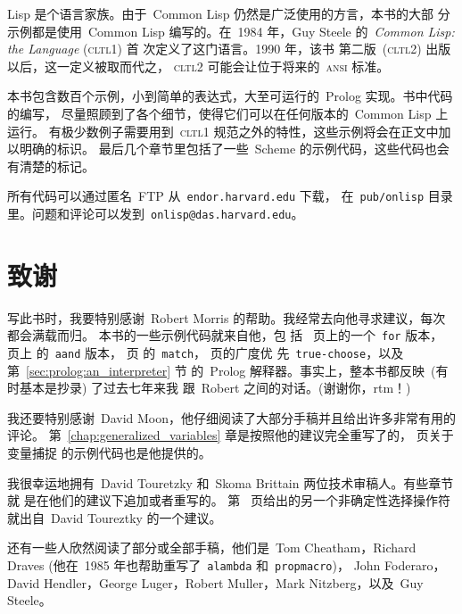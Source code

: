 Lisp 是个语言家族。由于~Common Lisp 仍然是广泛使用的方言，本书的大部
分示例都是使用~Common Lisp 编写的。在~1984 年，Guy Steele 
的~\emph{Common Lisp: the Language}%
(\textsc{cltl}1) 首
次定义了这门语言。1990 年，该书
第二版~(\textsc{cltl}2)  出版以后，这一定义被取而代之，
\textsc{cltl}2 可能会让位于将来的~\textsc{ansi} 标准。

本书包含数百个示例，小到简单的表达式，大至可运行的~Prolog 实现。书中代码的编写，
尽量照顾到了各个细节，使得它们可以在任何版本的~Common Lisp 上运行。
有极少数例子需要用到~\textsc{cltl}1 规范之外的特性，这些示例将会在正文中加以明确的标识。
最后几个章节里包括了一些~Scheme 的示例代码，这些代码也会有清楚的标记。

所有代码可以通过匿名~\textsc{FTP} 从~\texttt{endor.harvard.edu} 下载，
在~\texttt{pub/onlisp} 目录里。问题和评论可以发到~\texttt{onlisp@das.harvard.edu}。

\section*{致谢}
\label{sec:acknowledgements}

写此书时，我要特别感谢~Robert Morris 的帮助。我经常去向他寻求建议，每次都会满载而归。
本书的一些示例代码就来自他，包
括~\pageref{fig:avoiding_capture_with_closure}
页上的一个~\texttt{for} 版本，
\pageref{fig:anaphoric_variants_of_common_lisp_operators} 页上
的~\verb|aand| 版本，\pageref{fig:matching_function} 页
的~\texttt{match}，\pageref{fig:correct_choose_in_scheme} 页的广度优
先~\texttt{true-choose}，以及第~\ref{sec:prolog:an_interpreter} 节
的~Prolog 解释器。事实上，整本书都反映~(有时基本是抄录) 了过去七年来我
跟~Robert 之间的对话。(谢谢你，rtm！)

我还要特别感谢~David Moon，他仔细阅读了大部分手稿并且给出许多非常有用的评论。
第~\ref{chap:generalized_variables}
章是按照他的建议完全重写了的，\pageref{example:capture} 页关于变量捕捉
的示例代码也是他提供的。

我很幸运地拥有~David Touretzky 和~Skoma Brittain 两位技术审稿人。有些章节就
是在他们的建议下追加或者重写的。
第~\pageref{func:true-choice} 页给出的另一个非确定性选择操作符就出自~David Toureztky 的一个建议。

还有一些人欣然阅读了部分或全部手稿，他们是~Tom Cheatham，Richard Draves
(他在~1985 年也帮助重写了~\texttt{alambda} 和~\texttt{propmacro})，
John Foderaro，David Hendler，George Luger，Robert Muller，Mark
Nitzberg，以及~Guy Steele。 

